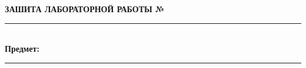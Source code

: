 \documentclass[11pt,a4paper]{extarticle}
\newcommand{\ulinefill}[1]{\rule[-2pt]{#1}{0.4pt}}
\begin{document}
\center
\textbf{ЗАШИТА ЛАБОРАТОРНОЙ РАБОТЫ №} \ulinefill{1cm}\\
\noindent
\textbf{Предмет: } \ulinefill{1cm}\\
\end{document}
